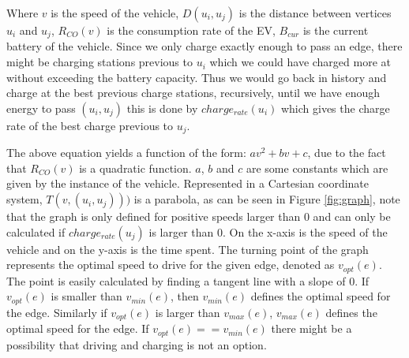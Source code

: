 Where $v$ is the speed of the vehicle, $D(u_i, u_j)$ is the distance between vertices $u_i$ and $u_j$, $R_{CO}(v)$ is the consumption rate of the EV, $B_{cur}$ is the current battery of the vehicle. Since we only charge exactly enough to pass an edge, there might be charging stations previous to $u_i$ which we could have charged more at without exceeding the battery capacity. Thus we would go back in history and charge at the best previous charge stations, recursively, until we have enough energy to pass $(u_i, u_j)$ this is done by $charge_{rate}(u_i)$ which gives the charge rate of the best charge previous to $u_j$.

The above equation yields a function of the form: $av^2 + bv + c$, due to the fact that $R_{CO}(v)$ is a quadratic function. $a$, $b$ and $c$ are some constants which are given by the instance of the vehicle. Represented in a Cartesian coordinate system, $T(v,(u_i, u_j)))$ is a parabola, as can be seen in Figure \ref{fig:graph}, note that the graph is only defined for positive speeds larger than $0$ and can only be calculated if $charge_{rate}(u_j)$ is larger than $0$. On the x-axis is the speed of the vehicle and on the y-axis is the time spent. The turning point of the graph represents the optimal speed to drive for the given edge, denoted as $v_{opt}(e)$. The point is easily calculated by finding a tangent line with a slope of $0$. If $v_{opt}(e)$ is smaller than $v_{min}(e)$, then $v_{min}(e)$ defines the optimal speed for the edge. Similarly if $v_{opt}(e)$ is larger than $v_{max}(e)$, $v_{max}(e)$ defines the optimal speed for the edge. If $v_{opt}(e) == v_{min}(e)$ there might be a possibility that driving and charging is not an option. 

